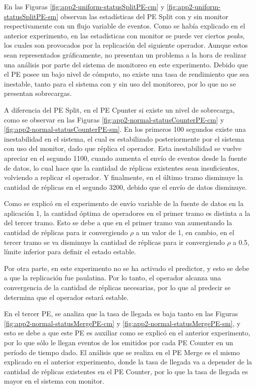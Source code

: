 En las Figuras \ref{fig:app2-uniform-statusSplitPE-cm} y \ref{fig:app2-uniform-statusSplitPE-sm} observan las estadísticas del PE Split con y sin monitor respectivamente con un flujo variable de eventos. Como se había explicado en el anterior experimento, en las estadísticas con monitor se puede ver ciertos \textit{peaks}, los cuales son provocados por la replicación del siguiente operador. Aunque estos sean representados gráficamente, no presentan un problema a la hora de realizar una análisis por parte del sistema de monitoreo en este experimento. Debido que el PE posee un bajo nivel de cómputo, no existe una tasa de rendimiento que sea inestable, tanto para el sistema con y sin uso del monitoreo, por lo que no se presentan sobrecargas.

A diferencia del PE Split, en el PE Cpunter si existe un nivel de sobrecarga, como se observar en las Figuras \ref{fig:app2-normal-statusCounterPE-cm} y \ref{fig:app2-normal-statusCounterPE-sm}. En los primeros 100 segundos existe una inestabilidad en el sistema, el cual es estabilizado posteriormente por el sistema con uso del monitor, dado que réplica el operador. Esta inestabilidad se vuelve apreciar en el segundo 1100, cuando aumenta el envío de eventos desde la fuente de datos, lo cual hace que la cantidad de réplicas existentes sean insuficientes, volviendo a replicar el operador. Y finalmente, en el último tramo disminuye la cantidad de réplicas en el segundo 3200, debido que el envío de datos disminuye.

Como se explicó en el experimento de envío variable de la fuente de datos en la aplicación 1, la cantidad óptima de operadores en el primer tramo es distinta a la del tercer tramo. Esto se debe a que en el primer tramo van aumentando la cantidad de réplicas para ir convergiendo $\rho$ a un valor de 1, en cambio, en el tercer tramo se va disminuye la cantidad de réplicas para ir convergiendo $\rho$ a 0.5, límite inferior para definir el estado estable.

Por otra parte, en este experimento no se ha activado el predictor, y esto se debe a que la replicación fue paulatina. Por lo tanto, el operador alcanza una convergencia de la cantidad de réplicas necesarias, por lo que al predecir se determina que el operador estará estable.

En el tercer PE, se analiza que la tasa de llegada es baja tanto en las Figuras \ref{fig:app2-normal-statusMergePE-cm} y \ref{fig:app2-normal-statusMergePE-sm}, y esto se debe a que este PE es auxiliar como se explicó en el anterior experimento, por lo que sólo le llegan eventos de los emitidos por cada PE Counter en un período de tiempo dado. El análisis que se realiza en el PE Merge es el mismo explicado en el anterior experimento, donde la tasa de llegada va a depender de la cantidad de réplicas existentes en el PE Counter, por lo que la tasa de llegada es mayor en el sistema con monitor.

